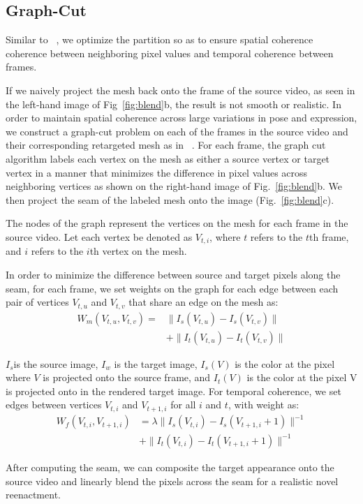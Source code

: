\subsection{Graph-Cut}
Similar to ~\cite{replace}, 
we optimize the partition so as to ensure spatial coherence coherence between neighboring pixel values
and temporal coherence between frames. 


If we naively project the mesh back onto the frame of the source video, as seen in the left-hand image of Fig~\ref{fig:blend}b, the result is not smooth or realistic. 
In order to maintain spatial coherence across large variations in pose and expression, 
 we construct a graph-cut problem on each of the frames in the source video and their corresponding retargeted mesh as in ~\cite{graphcut}. For each frame, the graph cut algorithm labels each vertex on the mesh as either a source vertex or target vertex in a manner that minimizes the difference in pixel values across neighboring vertices as shown on the right-hand image of Fig.~\ref{fig:blend}b. We then project the seam of the labeled mesh onto the image (Fig.~\ref{fig:blend}c). 

The nodes of the graph represent the vertices on the mesh for each frame in the source video. 
Let each vertex be denoted as $V_{t,i}$, where $t$ refers to the $t$th frame, and $i$ refers to the $i$th vertex on the mesh. 

In order to minimize the difference between source and target pixels along the seam, for each frame, we set weights on the graph for each edge between each pair of vertices $V_{t,u}$ and  $V_{t,v}$ that share an edge on the mesh as:
\begin{equation}
\begin{split}
W_m(V_{t,u}, V_{t,v}) = & \|I_{s}(V_{t,u})-I_{s}(V_{t,v})\|\\
& + \|I_{t}(V_{t,u})-I_{t}(V_{t, v})\| 
\end{split}
\end{equation}

 $I_{s}$is the source image, $I_{w}$ is the target image, $I_{s}(V)$ is the color at the pixel where $V$ is projected onto the source frame, and $I_{t}(V)$ is the color at the pixel V is projected onto in the rendered target image.
 For temporal coherence, we set edges between vertices $V_{t,i}$ and $V_{t+1,i}$ for all $i$ and $t$, with weight as:
\begin{equation}
\begin{split}
W_f(V_{t,i}, V_{t+1,i})& = \lambda \|I_{s}(V_{t,i})-I_{s}(V_{t+1,i} +1)\|^{-1}\\
              & + \|I_{t}(V_{t,i})-I_{t}(V_{t+1,i} + 1)\|^{-1}
\end{split}
\end{equation}

After computing the seam, we can composite the target appearance onto the source video and linearly blend the pixels across the seam for a realistic novel reenactment.  





